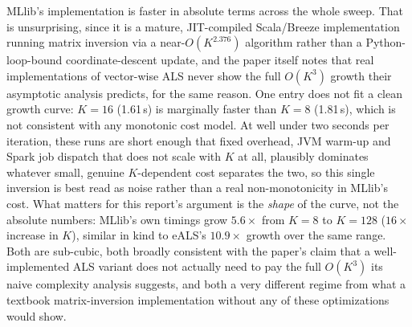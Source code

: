MLlib's implementation is faster in absolute terms across the whole sweep.
That is unsurprising, since it is a mature, JIT-compiled Scala/Breeze
implementation running matrix inversion via a near-$O(K^{2.376})$
algorithm rather than a Python-loop-bound coordinate-descent update, and
the paper itself notes that real implementations of vector-wise ALS never
show the full $O(K^3)$ growth their asymptotic analysis predicts, for the
same reason. One entry does not fit a clean growth curve: $K=16$
(1.61\,s) is marginally faster than $K=8$ (1.81\,s), which is not
consistent with any monotonic cost model. At well under two seconds per
iteration, these runs are short enough that fixed overhead, JVM warm-up
and Spark job dispatch that does not scale with $K$ at all, plausibly
dominates whatever small, genuine $K$-dependent cost separates the two,
so this single inversion is best read as noise rather than a real
non-monotonicity in MLlib's cost. What matters for this report's argument is the \emph{shape}
of the curve, not the absolute numbers: MLlib's own timings grow
$5.6\times$ from $K=8$ to $K=128$ ($16\times$ increase in $K$), similar in
kind to eALS's $10.9\times$ growth over the same range. Both are sub-cubic,
both broadly consistent with the paper's claim that a well-implemented ALS
variant does not actually need to pay the full $O(K^3)$ its naive
complexity analysis suggests, and both a very different regime from what a
textbook matrix-inversion implementation without any of these
optimizations would show.
